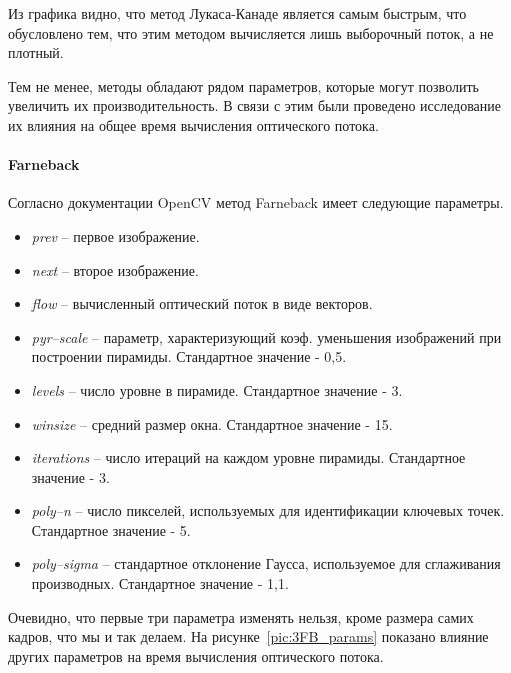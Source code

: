 Из графика видно, что метод Лукаса-Канаде является самым быстрым, что обусловлено тем, что этим методом вычисляется лишь выборочный поток, а не плотный. 

Тем не менее, методы обладают рядом параметров, которые могут позволить увеличить их производительность. В связи с этим были проведено исследование их влияния на общее время вычисления оптического потока. 

\paragraph{Farneback}
Согласно документации OpenCV метод Farneback имеет следующие параметры.
\begin{itemize}
\item \textit{prev} – первое изображение.
\item \textit{next} – второе изображение.
\item \textit{flow} – вычисленный оптический поток в виде векторов. 
\item \textit{pyr--scale} – параметр, характеризующий коэф. уменьшения изображений при построении пирамиды. Стандартное значение - 0,5.
\item \textit{levels} – число уровне в пирамиде. Стандартное значение - 3.
\item \textit{winsize} – средний размер окна. Стандартное значение - 15.
\item \textit{iterations} – число итераций на каждом уровне пирамиды. Стандартное значение - 3.
\item \textit{poly--n} – число пикселей, используемых для идентификации ключевых точек. Стандартное значение - 5.
\item \textit{poly--sigma} – стандартное отклонение Гаусса, используемое для сглаживания производных. Стандартное значение - 1,1.
\end{itemize}

Очевидно, что первые три параметра изменять нельзя, кроме размера самих кадров, что мы и так делаем. 
На рисунке~\ref{pic:3FB_params} показано влияние других параметров на время вычисления оптического потока. 

